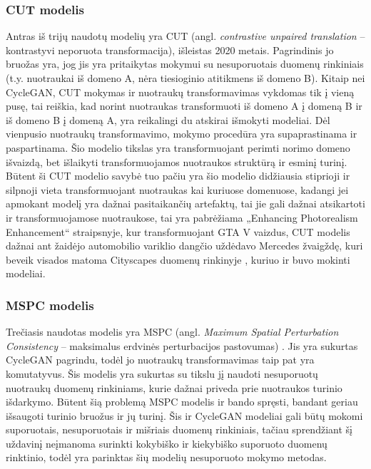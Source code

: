 \documentclass{VUMIFPSbakalaurinis}
\begin{document}
        \subsubsection{CUT modelis}
            Antras iš trijų naudotų modelių yra CUT (angl. \emph{contrastive unpaired translation} – kontrastyvi neporuota transformacija), išleistas 2020 metais. Pagrindinis jo bruožas yra, jog jis yra pritaikytas mokymui su nesuporuotais duomenų rinkiniais (t.y. nuotraukai iš domeno A, nėra tiesioginio atitikmens iš domeno B). Kitaip nei CycleGAN, CUT mokymas ir nuotraukų transformavimas vykdomas tik į vieną pusę, tai reiškia, kad norint nuotraukas transformuoti iš domeno A į domeną B ir iš domeno B į domeną A, yra reikalingi du atskirai išmokyti modeliai. Dėl vienpusio nuotraukų transformavimo, mokymo procedūra yra supaprastinama ir paspartinama. Šio modelio tikslas yra transformuojant perimti norimo domeno išvaizdą, bet išlaikyti transformuojamos nuotraukos struktūrą ir esminį turinį. Būtent ši CUT modelio savybė tuo pačiu yra šio modelio didžiausia stiprioji ir silpnoji vieta  transformuojant nuotraukas kai kuriuose domenuose, kadangi jei apmokant modelį yra dažnai pasitaikančių artefaktų, tai jie gali dažnai atsikartoti ir transformuojamose nuotraukose, tai yra pabrėžiama „Enhancing Photorealism Enhancement“ \cite{EnPhEn} straipsnyje, kur transformuojant GTA V vaizdus, CUT modelis dažnai ant žaidėjo automobilio variklio dangčio uždėdavo Mercedes žvaigždę, kuri beveik visados matoma Cityscapes duomenų rinkinyje \cite{DaimCityDaSe}, kuriuo ir buvo mokinti modeliai.
        \subsubsection{MSPC modelis}
            Trečiasis naudotas modelis yra MSPC (angl. \emph{Maximum Spatial Perturbation Consistency} – maksimalus erdvinės perturbacijos pastovumas) \cite{Mspc}. Jis yra sukurtas CycleGAN \cite{CycleGAN2017} pagrindu, todėl jo nuotraukų transformavimas taip pat yra komutatyvus. Šis modelis yra sukurtas su tikslu jį naudoti nesuporuotų nuotraukų duomenų rinkiniams, kurie dažnai priveda prie nuotraukos turinio išdarkymo. Būtent šią problemą MSPC modelis ir bando spręsti, bandant geriau išsaugoti turinio bruožus ir jų turinį. Šis ir CycleGAN modeliai gali būtų mokomi suporuotais, nesuporuotais ir mišriais duomenų rinkiniais, tačiau sprendžiant šį uždavinį neįmanoma surinkti kokybiško ir kiekybiško suporuoto duomenų rinktinio, todėl yra parinktas šių modelių nesuporuoto mokymo metodas.
\end{document}
